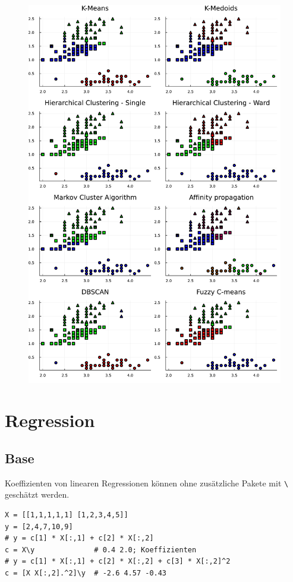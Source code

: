 \documentclass[10pt,twocolumn]{scrartcl}
\begin{document}
\begin{figure}[ht]
  \centering
  \includegraphics[width=.95\columnwidth]{cluster.pdf}
\end{figure}

\section{Regression}

\subsection{Base}

Koeffizienten von linearen Regressionen können ohne zusätzliche Pakete mit
\lstinline|\| geschätzt werden.

\begin{lstlisting}
X = [[1,1,1,1,1] [1,2,3,4,5]]
y = [2,4,7,10,9]
# y = c[1] * X[:,1] + c[2] * X[:,2]
c = X\y              # 0.4 2.0; Koeffizienten
# y = c[1] * X[:,1] + c[2] * X[:,2] + c[3] * X[:,2]^2
c = [X X[:,2].^2]\y  # -2.6 4.57 -0.43
\end{lstlisting}
\end{document}
